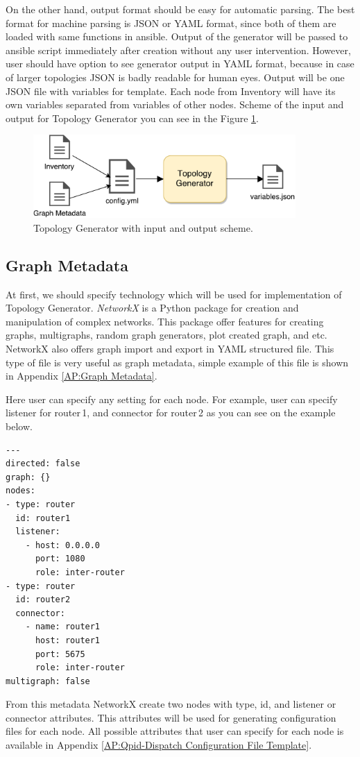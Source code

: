 On the other hand, output format should be easy for automatic parsing. The best format for machine parsing is JSON or YAML format, since both of them are loaded with same functions in ansible. Output of the generator will be passed to ansible script immediately after creation without any user intervention. However, user should have option to see generator output in YAML format, because in case of larger topologies JSON is badly readable for human eyes. Output will be one JSON file with variables for template. Each node from Inventory will have its own variables separated from variables of other nodes. Scheme of the input and output for Topology Generator you can see in the Figure \ref{fig:generator}.

\begin{figure}[H]
  \centering
  \includegraphics[width=10cm]{obrazky-figures/generator.pdf}
  \caption{Topology Generator with input and output scheme.}
  \label{fig:generator}
\end{figure}


\subsection{Graph Metadata}
\label{Graph Metadata}
At first, we should specify technology which will be used for implementation of Topology Generator. \emph{NetworkX} is a Python package for creation and manipulation of complex networks. This package offer features for creating graphs, multigraphs, random graph generators, plot created graph, and etc. NetworkX also offers graph import and export in YAML structured file. This type of file is very useful as graph metadata, simple example of this file is shown in Appendix \ref{AP:Graph Metadata}.

Here user can specify any setting for each node. For example, user can specify listener for router\,1, and connector for router\,2 as you can see on the example below.

\begin{verbatim}
---
directed: false
graph: {}
nodes:
- type: router					
  id: router1
  listener:
  	- host: 0.0.0.0
  	  port: 1080 	
  	  role: inter-router
- type: router					
  id: router2
  connector:
  	- name: router1
  	  host: router1
  	  port: 5675 	
  	  role: inter-router  
multigraph: false	  
\end{verbatim}
From this metadata NetworkX create two nodes with type, id, and listener or connector attributes. This attributes will be used for generating configuration files for each node. All possible attributes that user can specify for each node is available in Appendix \ref{AP:Qpid-Dispatch Configuration File Template}.

